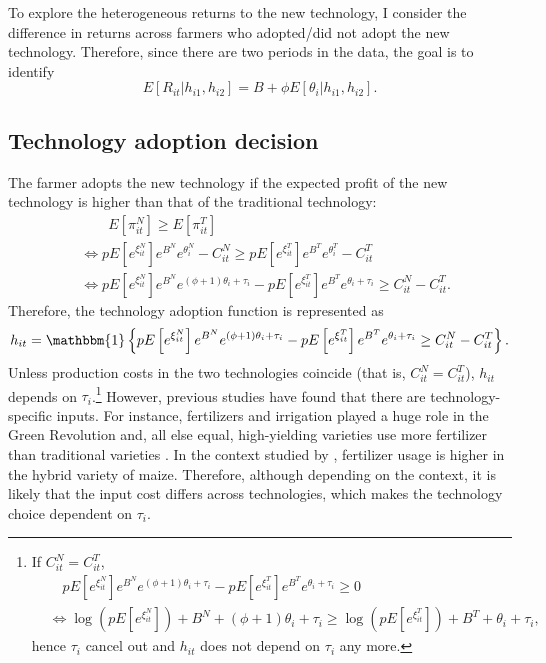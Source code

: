 \documentclass[11pt,letterpaper]{article}
\begin{document}
To explore the heterogeneous returns to the new technology, I consider the difference in returns across farmers who adopted/did not adopt the new technology.
Therefore, since there are two periods in the data, the goal is to identify
\begin{equation*}
  E[R_{it} | h_{i1}, h_{i2}] = B + \phi E[\theta_i | h_{i1}, h_{i2}].
\end{equation*}

\subsection{Technology adoption decision}

The farmer adopts the new technology if the expected profit of the new technology is higher than that of the traditional technology:
\begin{align*}
  &\qquad E[\pi_{it}^N] \ge E[\pi_{it}^T] \\
  &\Leftrightarrow p E\left[e^{\xi_{it}^N} \right] e^{B^N} e^{\theta_i^N}  - C_{it}^N \ge p E\left[e^{\xi_{it}^T} \right] e^{B^T} e^{\theta_i^T} - C_{it}^T \\
  &\Leftrightarrow p E\left[e^{\xi_{it}^N} \right] e^{B^N} e^{(\phi + 1) \theta_i + \tau_i} - p E\left[e^{\xi_{it}^T} \right] e^{B^T} e^{\theta_i + \tau_i} \ge C_{it}^N - C_{it}^T.
\end{align*}
Therefore, the technology adoption function is represented as 
\begin{equation}\label{eq:adoption}
  h_{it} = \mathbbm{1}\left\{p E\left[e^{\xi_{it}^N} \right] e^{B^N} e^{(\phi + 1) \theta_i + \tau_i} - p E\left[e^{\xi_{it}^T} \right] e^{B^T} e^{\theta_i + \tau_i} \ge C_{it}^N - C_{it}^T\right\}.
\end{equation}
Unless production costs in the two technologies coincide (that is, $C_{it}^N = C_{it}^T$), $h_{it}$ depends on $\tau_i$.\footnote{
  If $C_{it}^N = C_{it}^T$,
  \begin{align*}
    &\quad p E\left[e^{\xi_{it}^N} \right] e^{B^N} e^{(\phi + 1) \theta_i + \tau_i} - p E\left[e^{\xi_{it}^T} \right] e^{B^T} e^{\theta_i + \tau_i} \ge 0 \\
    &\Leftrightarrow \log \left(p E\left[e^{\xi_{it}^N} \right] \right) + B^N + (\phi + 1) \theta_i + \tau_i \ge \log \left( p E\left[e^{\xi_{it}^T} \right] \right) + B^T + \theta_i + \tau_i,
  \end{align*}
  hence $\tau_i$ cancel out and $h_{it}$ does not depend on $\tau_i$ any more.
}
However, previous studies have found that there are technology-specific inputs.
For instance, fertilizers and irrigation played a huge role in the Green Revolution and, all else equal, high-yielding varieties use more fertilizer than traditional varieties \citep{heisey2007fertilizers}.
In the context studied by \citet{Suri11}, fertilizer usage is higher in the hybrid variety of maize.
Therefore, although depending on the context, it is likely that the input cost differs across technologies, which makes the technology choice dependent on $\tau_i$.
\end{document}

